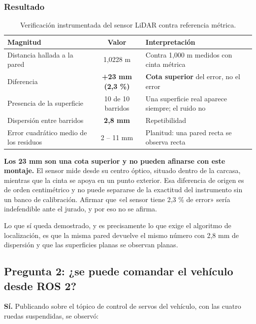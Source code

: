 \documentclass[12pt,letterpaper]{article}
\begin{document}
\subsubsection{Resultado}

\begin{table}[H]
    \centering
    \small
    \caption{Verificación instrumentada del sensor LiDAR contra referencia métrica.}
    \label{tab:lidar}
    \begin{tabular}{@{}lcp{6.2cm}@{}}
        \toprule
        \textbf{Magnitud} & \textbf{Valor} & \textbf{Interpretación} \\ \midrule
        Distancia hallada a la pared & 1,0228 m & Contra 1,000 m medidos con cinta métrica \\ \addlinespace
        Diferencia & \textbf{+23 mm (2,3 \%)} & \textbf{Cota superior} del error, no el error \\ \addlinespace
        Presencia de la superficie & 10 de 10 barridos & Una superficie real aparece siempre; el ruido no \\ \addlinespace
        Dispersión entre barridos & \textbf{2,8 mm} & Repetibilidad \\ \addlinespace
        Error cuadrático medio de los residuos & 2 -- 11 mm & Planitud: una pared recta se observa recta \\ \bottomrule
    \end{tabular}
\end{table}

\textbf{Los 23 mm son una cota superior y no pueden afinarse con este montaje.} El sensor mide desde su centro óptico, situado dentro de la carcasa, mientras que la cinta se apoya en un punto exterior. Esa diferencia de origen es de orden centimétrico y no puede separarse de la exactitud del instrumento sin un banco de calibración. Afirmar que «el sensor tiene 2,3 \% de error» sería indefendible ante el jurado, y por eso no se afirma.

Lo que sí queda demostrado, y es precisamente lo que exige el algoritmo de localización, es que la misma pared devuelve el mismo número con 2,8 mm de dispersión y que las superficies planas se observan planas.

\subsection{Pregunta 2: ¿se puede comandar el vehículo desde ROS 2?}

\textbf{Sí.} Publicando sobre el tópico de control de servos del vehículo, con las cuatro ruedas suspendidas, se observó:
\end{document}
